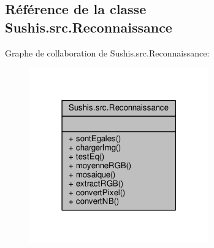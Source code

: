 \hypertarget{classSushis_1_1src_1_1Reconnaissance}{}\subsection{Référence de la classe Sushis.\+src.\+Reconnaissance}
\label{classSushis_1_1src_1_1Reconnaissance}


Graphe de collaboration de Sushis.\+src.\+Reconnaissance\+:\nopagebreak
\begin{figure}[H]
\begin{center}
\leavevmode
\includegraphics[width=219pt]{classSushis_1_1src_1_1Reconnaissance__coll__graph}
\end{center}
\end{figure}
